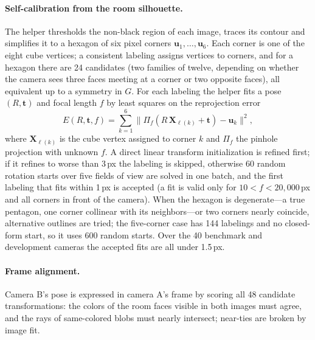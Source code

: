 \documentclass[10pt,a4paper]{article}
\begin{document}
\paragraph{Self-calibration from the room silhouette.}
The helper thresholds the non-black region of each image, traces its contour and simplifies it to a hexagon of six pixel corners $\mathbf{u}_1,\dots,\mathbf{u}_6$. Each corner is one of the eight cube vertices; a consistent labeling assigns vertices to corners, and for a hexagon there are 24 candidates (two families of twelve, depending on whether the camera sees three faces meeting at a corner or two opposite faces), all equivalent up to a symmetry in $G$. For each labeling the helper fits a pose $(R,\mathbf{t})$ and focal length $f$ by least squares on the reprojection error
\begin{equation}
E(R,\mathbf{t},f)=\sum_{k=1}^{6}\big\|\Pi_f(R\,\mathbf{X}_{\ell(k)}+\mathbf{t})-\mathbf{u}_k\big\|^2 ,
\label{eq:pose}
\end{equation}
where $\mathbf{X}_{\ell(k)}$ is the cube vertex assigned to corner $k$ and $\Pi_f$ the pinhole projection with unknown $f$. A direct linear transform initialization is refined first; if it refines to worse than 3\,px the labeling is skipped, otherwise 60 random rotation starts over five fields of view are solved in one batch, and the first labeling that fits within 1\,px is accepted (a fit is valid only for $10<f<20{,}000$\,px and all corners in front of the camera). When the hexagon is degenerate---a true pentagon, one corner collinear with its neighbors---or two corners nearly coincide, alternative outlines are tried; the five-corner case has 144 labelings and no closed-form start, so it uses 600 random starts. Over the 40 benchmark and development cameras the accepted fits are all under 1.5\,px.

\paragraph{Frame alignment.}
Camera B's pose is expressed in camera A's frame by scoring all 48 candidate transformations: the colors of the room faces visible in both images must agree, and the rays of same-colored blobs must nearly intersect; near-ties are broken by image fit.
\end{document}
